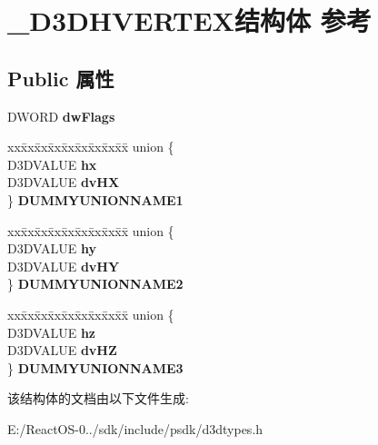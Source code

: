 \hypertarget{struct___d3_d_h_v_e_r_t_e_x}{}\section{\+\_\+\+D3\+D\+H\+V\+E\+R\+T\+E\+X结构体 参考}
\label{struct___d3_d_h_v_e_r_t_e_x}
\subsection*{Public 属性}
\begin{DoxyCompactItemize}
\item 
\mbox{\label{struct___d3_d_h_v_e_r_t_e_x_a4243704e57b2675410af04e3a2cbd2f4}} 
D\+W\+O\+RD {\bfseries dw\+Flags}
\item 
\mbox{\label{struct___d3_d_h_v_e_r_t_e_x_af0b44bcb18e17004f3f40f44d0cb11a6}} 
\begin{tabbing}
xx\=xx\=xx\=xx\=xx\=xx\=xx\=xx\=xx\=\kill
union \{\\
\>D3DVALUE {\bfseries hx}\\
\>D3DVALUE {\bfseries dvHX}\\
\} {\bfseries DUMMYUNIONNAME1}\\

\end{tabbing}\item 
\mbox{\label{struct___d3_d_h_v_e_r_t_e_x_a3d321aca2ed39adcd9e8c19d216c42be}} 
\begin{tabbing}
xx\=xx\=xx\=xx\=xx\=xx\=xx\=xx\=xx\=\kill
union \{\\
\>D3DVALUE {\bfseries hy}\\
\>D3DVALUE {\bfseries dvHY}\\
\} {\bfseries DUMMYUNIONNAME2}\\

\end{tabbing}\item 
\mbox{\label{struct___d3_d_h_v_e_r_t_e_x_a620404c4bb50079b7c53de152cb5d528}} 
\begin{tabbing}
xx\=xx\=xx\=xx\=xx\=xx\=xx\=xx\=xx\=\kill
union \{\\
\>D3DVALUE {\bfseries hz}\\
\>D3DVALUE {\bfseries dvHZ}\\
\} {\bfseries DUMMYUNIONNAME3}\\

\end{tabbing}\end{DoxyCompactItemize}


该结构体的文档由以下文件生成\+:\begin{DoxyCompactItemize}
\item 
E\+:/\+React\+O\+S-\/0../sdk/include/psdk/d3dtypes.\+h\end{DoxyCompactItemize}
